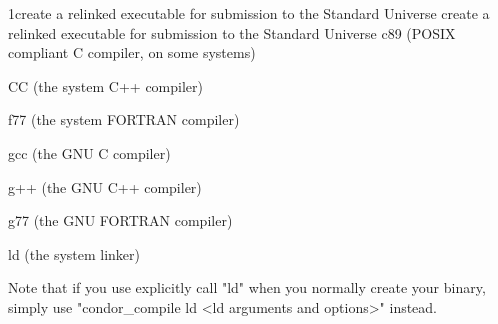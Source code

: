 \begin{ManPage}{}{1}{create a relinked executable for submission to the Standard Universe create a relinked executable for submission to the Standard Universe}
     c89 (POSIX compliant C compiler, on some systems) 

     CC (the system C++ compiler) 

     f77 (the system FORTRAN compiler) 

     gcc (the GNU C compiler) 

     g++ (the GNU C++ compiler) 

     g77 (the GNU FORTRAN compiler) 

     ld (the system linker) 

Note that if you use explicitly call "ld" when you normally create your binary, simply use "condor\_compile ld <ld arguments
and options>" instead. 

\end{ManPage}

